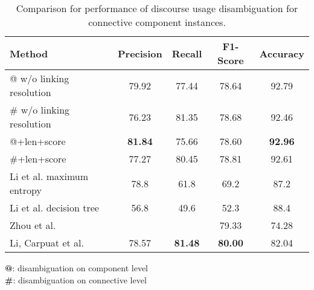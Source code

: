 \begin{table}[!htbp]
\centering
\begin{tabular}{|l|c|c|c|c|}
\hline

    Method                    &     Precision &     Recall &     F1-Score &     Accuracy \\ \hline
    @ w/o linking resolution  &     79.92     &     77.44  &     78.64    &     92.79    \\ \hline
    \# w/o linking resolution &     76.23     &     81.35  &     78.68    &     92.46    \\ \hline
    @+len+score               & \bf 81.84     &     75.66  &     78.60    & \bf 92.96    \\ \hline
    \#+len+score              &     77.27     &     80.45  &     78.81    &     92.61    \\

\hhline{|=|=|=|=|=|}

    Li et al. maximum entropy &     78.8      &     61.8   &     69.2     &     87.2     \\ \hline
    Li et al. decision tree   &     56.8      &     49.6   &     52.3     &     88.4     \\

\hhline{|=|=|=|=|=|}

    Zhou et al.               &               &            &     79.33    &     74.28    \\ \hline
    Li, Carpuat et al.        &     78.57     & \bf 81.48  & \bf 80.00    &     82.04    \\ \hline

\end{tabular}
\begin{flushleft}
\small
\textbf{@}: disambiguation on component level \\
\textbf{\#}: disambiguation on connective level \\
\end{flushleft}
\caption{\label{t:recognition-methods} Comparison for performance of discourse usage
disambiguation for connective component instances. }
\end{table}
